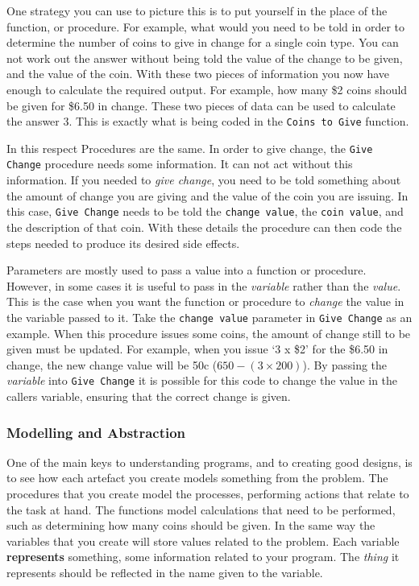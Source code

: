 One strategy you can use to picture this is to put yourself in the place of the function, or procedure. For example, what would you need to be told in order to determine the number of coins to give in change for a single coin type. You can not work out the answer without being told the value of the change to be given, and the value of the coin. With these two pieces of information you now have enough to calculate the required output. For example, how many \$2 coins should be given for \$6.50 in change. These two pieces of data can be used to calculate the answer 3. This is exactly what is being coded in the \texttt{Coins to Give} function.

In this respect Procedures are the same. In order to give change, the \texttt{Give Change} procedure needs some information. It can not act without this information. If you needed to \emph{give change}, you need to be told something about the amount of change you are giving and the value of the coin you are issuing. In this case, \texttt{Give Change} needs to be told the \texttt{change value}, the \texttt{coin value}, and the description of that coin. With these details the procedure can then code the steps needed to produce its desired side effects.

Parameters are mostly used to pass a value into a function or procedure. However, in some cases it is useful to pass in the \emph{variable} rather than the \emph{value}. This is the case when you want the function or procedure to \emph{change} the value in the variable passed to it. Take the \texttt{change value} parameter in \texttt{Give Change} as an example. When this procedure issues some coins, the amount of change still to be given must be updated. For example, when you issue `3 x \$2' for the \$6.50 in change, the new change value will be 50c ($650 - (3 \times 200)$). By passing the \emph{variable} into \texttt{Give Change} it is possible for this code to change the value in the callers variable, ensuring that the correct change is given.


\subsubsection{Modelling and Abstraction} %
\label{ssub:modelling_and_abstraction}

One of the main keys to understanding programs, and to creating good designs, is to see how each artefact you create models something from the problem. The procedures that you create model the processes, performing actions that relate to the task at hand. The functions model calculations that need to be performed, such as determining how many coins should be given. In the same way the variables that you create will store values related to the problem. Each variable \textbf{represents} something, some information related to your program. The \emph{thing} it represents should be reflected in the name given to the variable.

